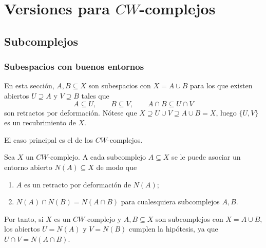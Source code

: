 \section{Versiones para $CW$-complejos}

\subsection{Subcomplejos}

\begin{frame}[allowframebreaks]
  \frametitle{Subespacios con buenos entornos}

  En esta sección, $A,B\subseteq X$ son subespacios con $X=A\cup B$ para los
  que existen abiertos $U\supseteq A$ y $V\supseteq B$ tales que
  \[
    A\subseteq U,\qquad B\subseteq V,\qquad A\cap B\subseteq U\cap V
  \]
  son retractos por deformación. Nótese que $X\supseteq U\cup V\supseteq A\cup B=X$,
  luego $\{U,V\}$ es un recubrimiento de $X$.

  \medskip

  \centering

  \framebreak

  El caso principal es el de los $CW$-complejos.

  \begin{proposition}
    Sea $X$ un $CW$-complejo. A cada subcomplejo $A\subseteq X$ se le puede
    asociar un entorno abierto $N(A)\subseteq X$ de modo que
    \begin{enumerate}
      \item $A$ es un retracto por deformación de $N(A)$;
      \item $N(A)\cap N(B)=N(A\cap B)$ para cualesquiera subcomplejos $A,B$.
    \end{enumerate}
  \end{proposition}

  Por tanto, si $X$ es un $CW$-complejo y
  $A,B\subseteq X$ son subcomplejos con $X=A\cup B$, los abiertos $U=N(A)$
  y $V=N(B)$ cumplen la hipótesis, ya que $U\cap V=N(A\cap B)$.
\end{frame}

